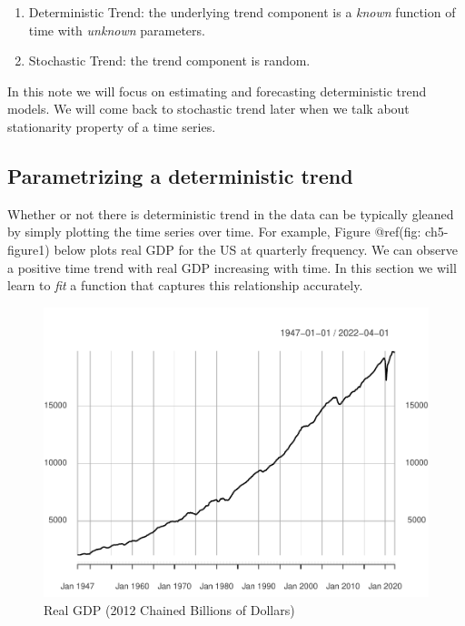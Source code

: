 \documentclass[]{book}
\theoremstyle{definition}
\theoremstyle{definition}
\theoremstyle{definition}
\theoremstyle{remark}
\begin{document}
\begin{enumerate}
\def\labelenumi{\arabic{enumi}.}
\item
  Deterministic Trend: the underlying trend component is a \emph{known}
  function of time with \emph{unknown} parameters.
\item
  Stochastic Trend: the trend component is random.
\end{enumerate}

In this note we will focus on estimating and forecasting deterministic
trend models. We will come back to stochastic trend later when we talk
about stationarity property of a time series.

\hypertarget{parametrizing-a-deterministic-trend}{%
\subsection{Parametrizing a deterministic
trend}\label{parametrizing-a-deterministic-trend}}

Whether or not there is deterministic trend in the data can be typically
gleaned by simply plotting the time series over time. For example,
Figure @ref(fig: ch5-figure1) below plots real GDP for the US at
quarterly frequency. We can observe a positive time trend with real GDP
increasing with time. In this section we will learn to \emph{fit} a
function that captures this relationship accurately.

\begin{figure}

{\centering \includegraphics[width=0.8\linewidth]{bookdown-demo_files/figure-latex/ch5-figure1-1} 

}

\caption{Real GDP (2012 Chained Billions of Dollars)}\label{fig:ch5-figure1}
\end{figure}
\end{document}
